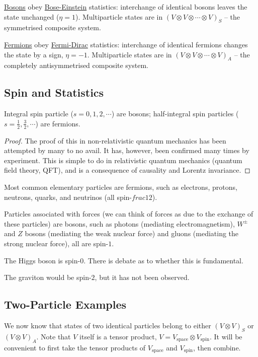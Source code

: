 \documentclass[../Main.tex]{subfiles}
\begin{document}
\underline{Bosons} obey \underline{Bose-Einstein} statistics: interchange of identical bosons leaves the state unchanged ($\eta = 1$). Multiparticle states are in $(V \otimes V \otimes \cdots \otimes V)_S$ -- the symmetrised composite system.

\underline{Fermions} obey \underline{Fermi-Dirac} statistics: interchange of identical fermions changes the state by a sign, $\eta = -1$. Multiparticle states are in $(V \otimes V \otimes \cdots \otimes V)_A$ -- the completely antisymmetrised composite system.
\subsection{Spin and Statistics}
\begin{proposition}
    Integral spin particle ($s = 0, 1, 2, \cdots$) are bosons; half-integral spin particles ($s = \frac12, \frac32, \cdots$) are fermions.
    \label{propSpinStatistic}
\end{proposition}
\begin{proof}
    The proof of this in non-relativistic quantum mechanics has been attempted by many to no avail. It has, however, been confirmed many times by experiment. This is simple to do in relativistic quantum mechanics (quantum field theory, QFT), and is a consequence of causality and Lorentz invariance.
\end{proof}
\begin{remarks}
    \item Most common elementary particles are fermions, such as electrons, protons, neutrons, quarks, and neutrinos (all spin-$frac12$).
    \item Particles associated with forces (we can think of forces as due to the exchange of these particles) are bosons, such as photons (mediating electromagnetism), $W^\pm$ and $Z$ bosons (mediating the weak nuclear force) and gluons (mediating the strong nuclear force), all are spin-$1$.
    \item The Higgs boson is spin-$0$. There is debate as to whether this is fundamental.
    \item The graviton would be spin-$2$, but it has not been observed.
\end{remarks}
\subsection{Two-Particle Examples}
We now know that states of two identical particles belong to either $(V \otimes V)_S$ or $(V \otimes V)_A$. Note that $V$ itself is a tensor product, $V = V_{\text{space}} \otimes V_{\text{spin}}$. It will be convenient to first take the tensor products of $V_{\text{space}}$ and $V_{\text{spin}}$, then combine.
\end{document}
